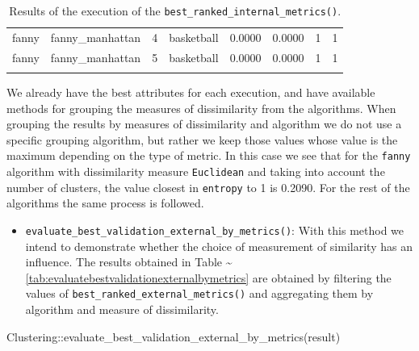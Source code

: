 \documentclass[
]{article}
\newenvironment{Shaded}{\begin{snugshade}}{\end{snugshade}}
\newcommand{\FunctionTok}[1]{\textcolor[rgb]{0.00,0.00,0.00}{#1}}
\newcommand{\NormalTok}[1]{#1}
\newcommand{\SpecialCharTok}[1]{\textcolor[rgb]{0.00,0.00,0.00}{#1}}
\providecommand{\tightlist}{%
  \setlength{\itemsep}{0pt}\setlength{\parskip}{0pt}}
\begin{document}
\begin{longtable}{| p{1.3cm} | p{2.1cm} | p{0.9cm} | p{1.1cm} | p{1.6cm} | p{0.8cm} | p{1.3cm} | p{1.9cm} |}
\scriptsize   fanny    & \scriptsize fanny\_manhattan & \scriptsize    4     & \scriptsize basketball & \scriptsize    0.0000    & \scriptsize 0.0000 & \scriptsize    1     & \scriptsize        1 \\
\scriptsize   fanny    & \scriptsize fanny\_manhattan & \scriptsize    5     & \scriptsize basketball & \scriptsize    0.0000    & \scriptsize 0.0000 & \scriptsize    1     & \scriptsize        1 \\
\hline
\caption{Results of the execution of the \texttt{best\_ranked\_internal\_metrics()}.}
\label{tab:clusteringbestrankedinternalmetrics}
\end{longtable}

We already have the best attributes for each execution, and have
available methods for grouping the measures of dissimilarity from the
algorithms. When grouping the results by measures of dissimilarity and
algorithm we do not use a specific grouping algorithm, but rather we
keep those values whose value is the maximum depending on the type of
metric. In this case we see that for the \texttt{fanny} algorithm with
dissimilarity measure \texttt{Euclidean} and taking into account the
number of clusters, the value closest in \texttt{entropy} to 1 is
0.2090. For the rest of the algorithms the same process is followed.

\begin{itemize}
\tightlist
\item
  \texttt{evaluate\_best\_validation\_external\_by\_metrics()}: With
  this method we intend to demonstrate whether the choice of measurement
  of similarity has an influence. The results obtained in Table
  \textasciitilde{}\ref{tab:evaluatebestvalidationexternalbymetrics} are
  obtained by filtering the values of
  \texttt{best\_ranked\_external\_metrics()} and aggregating them by
  algorithm and measure of dissimilarity.
\end{itemize}

\begin{Shaded}
\begin{Highlighting}[]
\NormalTok{Clustering}\SpecialCharTok{::}\FunctionTok{evaluate\_best\_validation\_external\_by\_metrics}\NormalTok{(result)}
\end{Highlighting}
\end{Shaded}
\end{document}
